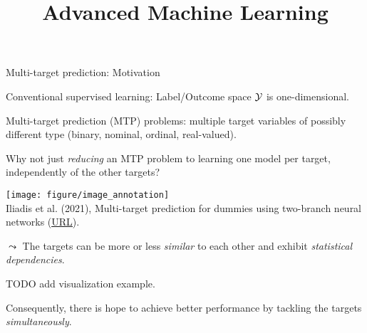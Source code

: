 \documentclass[11pt,compress,t,notes=noshow, xcolor=table]{beamer}
\title{Advanced Machine Learning}
\date{}
\begin{document}



\sloppy

\begin{vbframe}{Multi-target prediction: Motivation}
\scriptsize{
    \begin{itemize}    
        \item Conventional supervised learning: Label/Outcome space $\mathcal{Y}$ is one-dimensional.	
        \begin{minipage}{0.45\textwidth}    

            \item Multi-target prediction (MTP) problems: multiple target variables of possibly different type (binary, nominal, ordinal, real-valued).
            \vspace{10pt}
            
            \item Why not just \emph{reducing} an MTP problem to learning one model per target, independently of the other targets? 
		\end{minipage}
        \hfill
		\begin{minipage}{0.45\textwidth}    
			\begin{center}

                \texttt{[image: figure/image\_annotation]} 		\tiny
                \\ Iliadis et al. (2021), Multi-target prediction for dummies using
                two-branch neural networks (\href{https://arxiv.org/abs/2104.09967}{\underline{URL}}).
   	
			\end{center}
		\end{minipage}

		\item $\leadsto$ The targets can be more or less \emph{similar} to each other and exhibit \emph{statistical dependencies}.
	    \vspace{10pt}

        \item TODO add visualization example.
        \vspace{10pt}
	
		\item Consequently, there is hope to achieve better performance by tackling the targets \emph{simultaneously}.

    \end{itemize}}

\end{vbframe}
\end{document}

